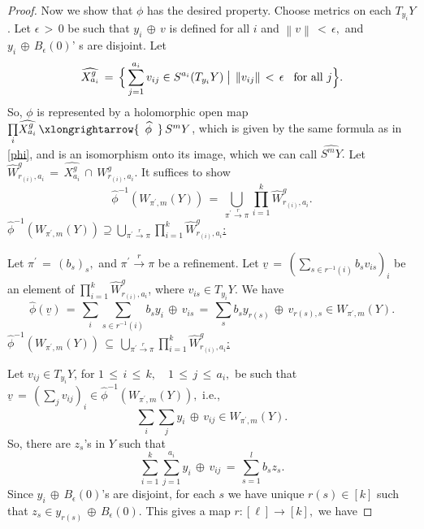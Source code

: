 \documentclass[12pt,reqno]{amsart}
\newcommand{\norm}[1]{\left \lVert #1 \right \rVert}
\theoremstyle{definition}
\numberwithin{equation}{section}
\begin{document}
\begin{proof}
Now we show that $\phi$ has the desired property.
Choose metrics on each $T_{y_{i}}Y$. Let $\epsilon \,>\,0$ be such that $ y_{i}\,\oplus\, v$ is defined for all $i$ and $\norm{v}\, <\, \epsilon, $ and $ y_{i}\,\oplus\, B_{\epsilon}(0)$' s are disjoint. Let $$\widehat{X_{a_{i}}^{g}}\,=\, \Big \{ \sum_{j=1}^{a_{i}}v_{ij} \in S^{a_{i}}(T_{y_{i}}Y) \hspace{1pt}\,\big{|}\, \hspace{1pt}  \norm{v_{ij}}\,<\, \epsilon  \hspace{0.3cm} \textnormal{for all}\,\, j \Big \}.$$ 
So, $\phi$ is represented by a holomorphic open map 
    $\underset{i} {\prod}\widehat{X_{a_{i}}^{g}}\, \xlongrightarrow{\,\,\,\widehat{\phi}\,\,\,}\, S^{m}Y$, which is given by the same formula as in  \eqref{phi}, and is an isomorphism onto its image, which we can call $ \widehat{S^{m}Y}.$ Let $ \widehat{W}_{r_{(i)},a_{i}}^{g}\,=\, \widehat{X_{a_{i}}^{g}} \,\cap\, W_{r_{(i)},a_{i}}^{g} $. It suffices to show $$ {\widehat{\phi}}^{-1}(W_{\pi^{\prime},m}(Y))\,=\, \bigcup_{\pi^{\prime}\xrightarrow{r} \pi} \prod_{i=1}^{k} \widehat{W}_{r_{(i)},a_{i}}^{g} .$$
     \underline{$ {\widehat{\phi}}^{-1}( W_{\pi^{\prime},m}(Y)) \supseteq\underset{\pi^{\prime}\xrightarrow{r} \pi}{\bigcup} \prod_{i=1}^{k} \widehat{W}_{r_{(i)},a_{i}}^{g}  $:} 
    
    Let  $ \pi^{\prime}\,=\, (b_{s})_{s},$ and $ \pi^{\prime}\xrightarrow{r} \pi$ be a refinement. Let $ \underline{v}\,=\,(\underset{s\in r^{-1}(i)}{\sum}b_{s}v_{is})_{i}$ be an element of $ \prod _{i=1}^k \widehat{W}_{r_{(i)},a_{i}}^{g}$, where $ v_{is}\in T_{y_{i}}Y.$ We have 
    $$ \widehat{\phi}(\underline{v})\,=\, \sum_{i} \sum_{s\in r^{-1}(i)}b_{s}y_{i}\, \oplus\, v_{is}\,=\, \sum_{s}b_{s}y_{r(s)}\,\oplus\, v_{r(s),s} \in W_{\pi^{\prime},m}(Y).$$
\underline{$ \widehat{\phi}^{-1}( W_{\pi^{\prime},m}(Y)) \,\subseteq\, \underset{\pi^{\prime}\xrightarrow{r} \pi}{\bigcup} \prod_{i=1}^{k} \widehat{W}_{r_{(i)},a_{i}}^{g}  $:}

    Let $ v_{ij} \in T_{y_{i}}Y$, for $1\,\leq\, i\,\leq\, k,\quad 1\,\leq\, j\, \leq\, a_i,$ be such that $ \underline{v}\,=\, (\sum_{j}v_{ij})_{i} \in \widehat{\phi}^{-1}(W_{\pi^{\prime},m}(Y)),$ i.e., $$ \sum_{i}\sum_{j}y_{i}\,\oplus\, v_{ij} \in W_{\pi^{\prime},m}(Y).$$ So, there are $z_{s}$'s in $Y$ such that 
    $$ \sum_{i=1}^{k} \sum_{j=1}^{a_{i}} y_{i}\,\oplus\, v_{ij}\,=\,\sum_{s=1}^l b_{s}z_{s}.$$
    Since  $ y_{i}\,\oplus\, B_{\epsilon}(0)$'s are disjoint, for each $s$ we have unique $ r(s)\in [k]$ such that $ z_{s} \in y_{r({s})}\, \oplus\, B_{\epsilon}(0).$ This gives a map $ r : [\ell]\longrightarrow [k],$ we have 
    

\end{proof}
\end{document}
